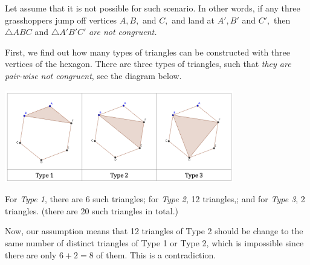 \documentclass{article}
\begin{document}
\begin{soln}
    Let assume that it is not possible for such scenario. In other words, if any three grasshoppers jump off vertices $A, B,$ and $C,$
    and land at $A', B'$ and $C',$ then $\triangle ABC$ and $\triangle A'B'C'$ \textit{are not congruent.}

    First, we find out how many types of triangles can be constructed with three vertices of the hexagon.
    There are three types of triangles, such that \textit{they are pair-wise not congruent}, see the diagram below.
    \begin{center}
        \includegraphics[width=10cm]{./png/sc-23-ms-2-p10.png}
    \end{center}
    
    For \textit{Type 1}, there are 6 such triangles; for \textit{Type 2}, 12 triangles,; and for \textit{Type 3}, 2 triangles.
    (there are 20 such triangles in total.) 

    Now, our assumption means that 12 triangles of Type 2 should be change to the same number of distinct triangles of Type 1 or Type 2,
    which is impossible since there are only $6+2=8$ of them. This is a contradiction.
\end{soln}
\end{document}
